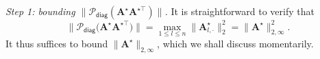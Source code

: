 \bigskip\noindent
{\em Step 1: bounding $\|\mathcal{P}_{\mathsf{diag}} (\bm{A}^{\star}\bm{A}^{\star\top})\|$.}
It is straightforward to verify that
%
\begin{equation}
\big\|\mathcal{P}_{\mathsf{diag}}\big(\bm{A}^{\star}\bm{A}^{\star\top}\big)\big\|=\max_{1\leq l\leq n}\big\|\bm{A}_{l,\cdot}^{\star}\big\|_{2}^{2}=\big\|\bm{A}^{\star}\big\|_{2,\infty}^{2}.
	\label{eq:P-diag-AAT-bound-TC}
\end{equation}
%
It thus suffices to  bound $\|\bm{A}^{\star}\|_{2,\infty}$, which we shall discuss momentarily.


%


